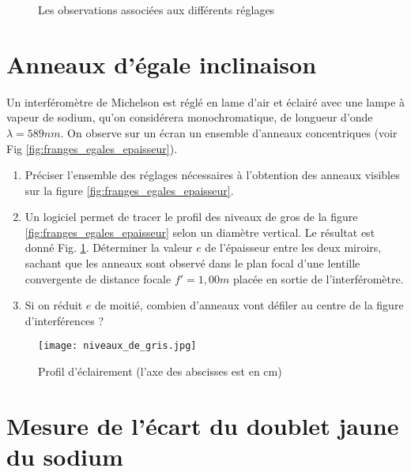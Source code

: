 \documentclass{article}
\begin{document}
\begin{figure}[h!]
  \caption{Les observations associées aux différents réglages}
\end{figure}


\newpage
\section{Anneaux d'égale inclinaison}

Un interféromètre de Michelson est réglé en lame d'air et éclairé avec une lampe à vapeur de sodium, qu'on considérera monochromatique, de longueur d'onde $\lambda = 589nm$.
On observe sur un écran un ensemble d'anneaux concentriques (voir Fig \ref{fig:franges_egales_epaisseur}). 
\begin{enumerate}
  \item Préciser l'ensemble des réglages nécessaires à l'obtention des anneaux visibles sur la figure \ref{fig:franges_egales_epaisseur}. 
  \item Un logiciel permet de tracer le profil des niveaux de gros de la figure \ref{fig:franges_egales_epaisseur} selon un diamètre vertical. Le résultat est donné Fig. \ref{fig:niveaux_de_gris}. Déterminer la valeur $e$ de l'épaisseur entre les deux miroirs, sachant que les anneaux sont observé dans le plan focal d'une lentille convergente de distance focale $f'=1,00m$ placée en sortie de l'interféromètre.
  \item Si on réduit $e$ de moitié, combien d'anneaux vont défiler au centre de la figure d'interférences ?  
\end{enumerate}

\begin{figure}
  \centering
  \texttt{[image: niveaux\_de\_gris.jpg]}
  \caption{Profil d'éclairement (l'axe des abscisses est en cm)}   
  \label{fig:niveaux_de_gris}
\end{figure}


\section{Mesure de l'écart du doublet jaune du sodium}
\end{document}
